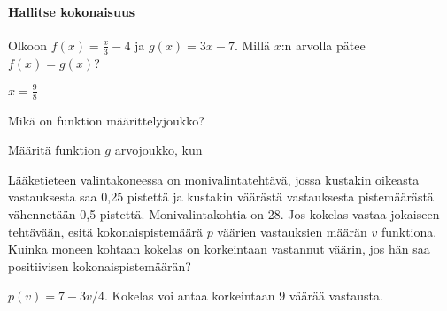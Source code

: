 \begin{tehtavasivu}
\begin{tehtava}
  \begin{vastaus}
  \end{vastaus} 
\end{tehtava}


\paragraph*{Hallitse kokonaisuus}

\begin{tehtava}
  Olkoon $f(x)=\frac{x}{3}-4$ ja $g(x)=3x-7$. Millä $ x $:n arvolla pätee $ f(x)=g(x)$?
  \begin{vastaus}
$ x=\frac{9}{8} $
  \end{vastaus}
\end{tehtava}

\begin{tehtava}
  Mikä on funktion määrittelyjoukko?

\end{tehtava}

\begin{tehtava}
	Määritä funktion $g$ arvojoukko, kun
\end{tehtava}

\begin{tehtava}
	Lääketieteen valintakoneessa on monivalintatehtävä, jossa kustakin oikeasta vastauksesta 	saa 0,25 pistettä ja kustakin väärästä vastauksesta pistemäärästä vähennetään 0,5				pistettä. Monivalintakohtia on 28. Jos kokelas vastaa jokaiseen tehtävään, esitä 				kokonaispistemäärä $p$ väärien vastauksien määrän $v$ funktiona. Kuinka moneen kohtaan 			kokelas on korkeintaan vastannut väärin, jos hän saa positiivisen kokonaispistemäärän?
	\begin{vastaus}
		$p(v) = 7-3v/4$. Kokelas voi antaa korkeintaan $9$ väärää vastausta.
	\end{vastaus}
	
\end{tehtava}



\end{tehtavasivu}
